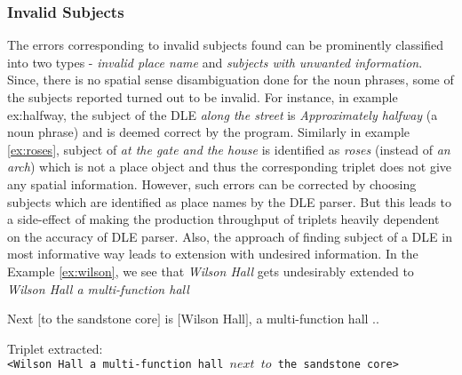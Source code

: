 \documentclass{acm_proc_article-sp}
\begin{document}
\subsubsection{Invalid Subjects} 
The errors corresponding to invalid subjects found can be prominently classified into two types - \textit{invalid place name} and \textit{subjects with unwanted information}. Since, there is no spatial sense disambiguation done for the noun phrases, some of the subjects reported turned out to be invalid. For instance, in example {ex:halfway}, the subject of the DLE \textit{along the street} is \textit{Approximately halfway} (a noun phrase) and is deemed correct by the program. Similarly in example \ref{ex:roses}, subject of \textit{at the gate and the house} is identified as \textit{roses} (instead of \textit{an arch}) which is not a place object and thus the corresponding triplet does not give any spatial information. However, such errors can be corrected by choosing subjects which are identified as place names by the DLE parser. But this leads to a side-effect of making the production throughput of triplets heavily dependent on the accuracy of DLE parser.
Also, the approach of finding subject of a DLE in most informative way leads to extension with undesired information. In the Example \ref{ex:wilson}, we see that \textit{Wilson Hall} gets undesirably extended to \textit{Wilson Hall a multi-function hall}
\begin{example}
\label{ex:wilson}
Next $[$to the sandstone core$]$ is $[$Wilson Hall$]$, a multi-function hall ..
\end{example}
Triplet extracted:\\
\texttt{<Wilson Hall a multi-function hall $next$ $to$ the sandstone core>}
\end{document}
